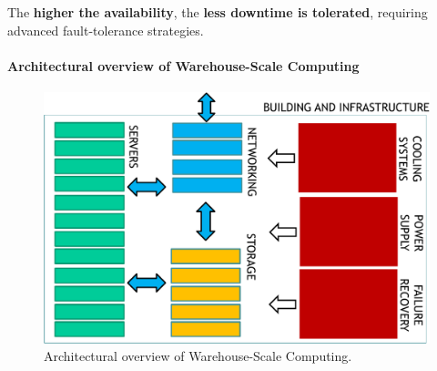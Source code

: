 \noindent
The \textbf{higher the availability}, the \textbf{less downtime is tolerated}, requiring advanced fault-tolerance strategies.

\newpage

\paragraph{Architectural overview of Warehouse-Scale Computing}

\begin{figure}[!htp]
    \centering
    \includegraphics[width=\textwidth]{img/WSC-architecture-1.pdf}
    \caption{Architectural overview of Warehouse-Scale Computing.}
\end{figure}

